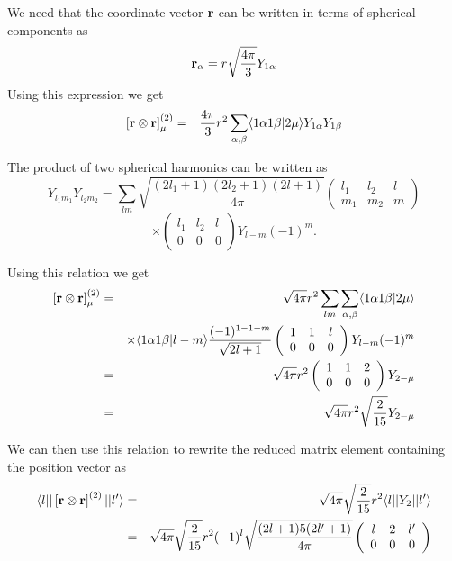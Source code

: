 \documentclass[graybox,sectrefs,envcountresetchap,open=right]{svmonodo}
\begin{document}
We need that
the coordinate vector ${\bf r}$ can be written in terms of spherical 
components as 
\[
{\bf r}_\alpha = r\sqrt{\frac{4\pi}{3}} Y_{1\alpha}
\]
Using this expression we get 
\begin{eqnarray*}
\left[{\bf r} \otimes {\bf r} \right]^{(2)}_\mu &=& \frac{4\pi}{3}r^2
\sum_{\alpha ,\beta}\langle 1\alpha 1\beta\vert 2\mu \rangle Y_{1\alpha} Y_{1\beta}
\end{eqnarray*}



The product of two spherical harmonics can be written
as
\[
Y_{l_1m_1} Y_{l_2m_2}=\sum_{lm}\sqrt{\frac{(2l_1+1)(2l_2+1)(2l+1)}{4\pi}}
\left(\begin{array}{ccc} l_1&l_2&l \\ m_1&m_2&m\end{array}\right)
\]
\[
\times \left(\begin{array}{ccc} l_1&l_2&l \\ 0  &0  &0\end{array}\right)
Y_{l-m}(-1)^m.
\]


Using this relation we get  
\begin{eqnarray*}
\left[{\bf r} \otimes {\bf r} \right]^{(2)}_\mu &=& 
\sqrt{4\pi}r^2
\sum_{lm}
\sum_{\alpha ,\beta}   \langle 1\alpha 1\beta\vert 2\mu \rangle \\
&&\times \langle 1\alpha 1\beta\vert l-m \rangle
\frac{(-1)^{1-1-m}}{\sqrt{2l+1}} 
\left(\begin{array}{ccc} 1&1&l \\ 0  &0  &0\end{array}\right)Y_{l-m}(-1)^m\\
&=& \sqrt{4\pi}r^2
\left(\begin{array}{ccc} 1&1&2 \\ 0  &0  &0\end{array}\right)
Y_{2-\mu}\\
&=& \sqrt{4\pi}r^2 \sqrt{\frac{2}{15}}Y_{2-\mu}
\end{eqnarray*}




We can then  use this relation to rewrite the reduced matrix element containing the 
position vector as  
\begin{eqnarray*}
\langle l \vert\vert\left[{\bf r} \otimes {\bf r} \right]^{(2)} \vert \vert l'\rangle
& = & 
\sqrt{4\pi}\sqrt{ \frac{2}{15}}r^2 \langle l \vert\vert Y_2 \vert \vert l'\rangle \\
& = &\sqrt{4\pi}\sqrt{ \frac{2}{15}}  r^2 (-1)^l
\sqrt{\frac{(2l+1)5(2l'+1)}{4\pi}}
\left(\begin{array}{ccc} l&2&l' \\ 0&0&0\end{array}\right)
\end{eqnarray*}
\end{document}
